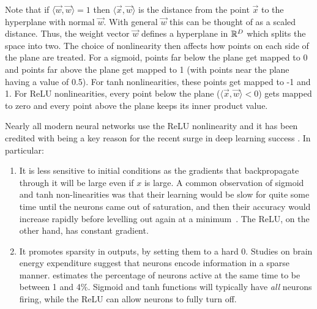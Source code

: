 Note that if $\langle\vec{w}, \vec{w}\rangle = 1$ then $\langle\vec{x},
\vec{w}\rangle$ is the distance from the point $\vec{x}$ to the hyperplane with
normal $\vec{w}$. With general $\vec{w}$ this can be thought of as a scaled
distance. Thus, the weight vector $\vec{w}$ defines a hyperplane in $\reals[D]$
which splits the space into two. The choice of nonlinearity then affects how
points on each side of the plane are treated. For a sigmoid, points far below
the plane get mapped to 0 and points far above the plane get mapped to 1 (with
points near the plane having a value of 0.5). For tanh nonlinearities, these
points get mapped to -1 and 1. For ReLU nonlinearities, every point below the
plane ($\langle\vec{x}, \vec{w}\rangle < 0$) gets mapped to zero and every point
above the plane keeps its inner product value. 

Nearly all modern neural networks use the ReLU nonlinearity and it has
been credited with being a key reason for the recent surge in deep learning
success \cite{glorot_deep_2011, nair_rectified_2010}. In particular:
\begin{enumerate}
\item It is less sensitive to initial conditions as the gradients that
  backpropagate through it will be large even if $x$ is large. A common
  observation of sigmoid and tanh non-linearities was that their learning would
  be slow for quite some time until the neurons came out of saturation, and then
  their accuracy would increase rapidly before levelling out again at
  a minimum~\citep{glorot_understanding_2010}. The ReLU, on the other hand, has
  constant gradient.
\item It promotes sparsity in outputs, by setting them to a hard 0. Studies
  on brain energy expenditure suggest that neurons encode information in
  a sparse manner. \citet{lennie_cost_2003} estimates the percentage of
  neurons active at the same time to be between 1 and 4\%. Sigmoid and tanh
  functions will typically have \emph{all} neurons firing, while 
  the ReLU can allow neurons to fully turn off.
\end{enumerate}

\begin{figure}
    \qquad
    
    \quad
    
  \centering
  \label{fig:ch2:nonlinearities}
\end{figure}

